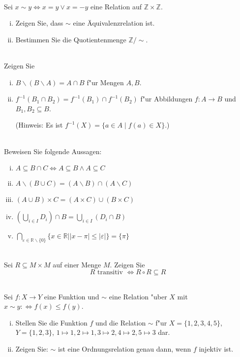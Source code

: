 \\
Sei $x\sim y\Leftrightarrow x=y \vee x=-y$ eine Relation auf $\mathbb{Z}\times\mathbb{Z}$. 
\begin{enumerate}[(i)]
    \item Zeigen Sie, dass $\sim$ eine Äquivalenzrelation ist.
    \item Bestimmen Sie die Quotientenmenge $\mathbb{Z}/\sim$.
\end{enumerate}

\\
Zeigen Sie
\begin{enumerate}[(i)]
    \item $B\backslash (B\backslash A)=A\cap B$ f"ur Mengen $A,B$.
    \item $f^{-1}(B_1\cap B_2)=f^{-1}(B_1)\cap f^{-1}(B_2)$ f"ur Abbildungen $f:A\to B$ und $B_1,B_2\subseteq B$. 
    
    (Hinweis: Es ist $f^{-1}(X)=\{a\in A\mid f(a)\in X\}$.)
\end{enumerate}


 \\
Beweisen Sie folgende Aussagen:
\begin{enumerate}[(i)]
  \item $A\subseteq B\cap C\Leftrightarrow A\subseteq B\wedge A\subseteq C$
  \item $A\backslash(B\cup C)=(A\backslash B)\cap (A\backslash C)$
  \item $(A\cup B)\times C=(A\times C)\cup (B\times C)$
  \item $\left(\bigcup_{i\in I}D_i\right)\cap B=\bigcup_{i\in I}(D_i\cap B)$
  \item $\bigcap_{\varepsilon\in\mathbb{R}\backslash\{0\}}\{x\in\mathbb{R}||x-\pi|\leq |\varepsilon|\}=\{\pi\}$
\end{enumerate}

\\
Sei $R\subseteq M\times M$ auf einer Menge $M$. Zeigen Sie \[R\mbox{ transitiv }\Leftrightarrow R\circ R\subseteq R\]


\\
Sei $f:X\to Y$ eine Funktion und $\sim$ eine Relation "uber $X$ mit $x\sim y:\Leftrightarrow f(x)\leq f(y)$.
\begin{enumerate}[(i)]
    \item Stellen Sie die Funktion $f$ und die Relation $\sim$ f"ur $X=\{1,2,3,4,5\}$, $Y=\{1,2,3\}$, $1\mapsto 1, 2\mapsto 1, 3\mapsto 2, 4\mapsto 2, 5\mapsto 3$ dar.
    \item Zeigen Sie: $\sim$ ist eine Ordnungsrelation genau dann, wenn $f$ injektiv ist.
\end{enumerate}




